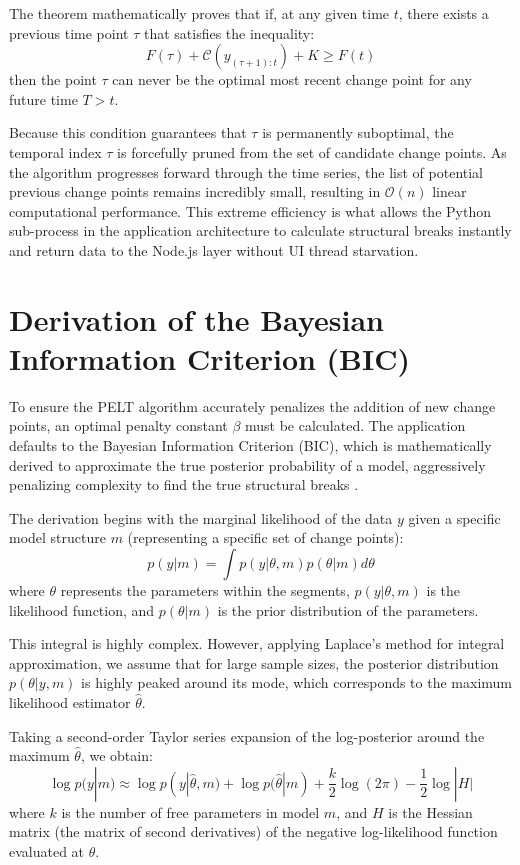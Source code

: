 \documentclass[11pt, a4paper]{report}
\begin{document}
The theorem mathematically proves that if, at any given time $t$, there exists a previous time point $\tau$ that satisfies the inequality:
\begin{equation}
    F(\tau) + \mathcal{C}(y_{(\tau+1):t}) + K \ge F(t)
\end{equation}
then the point $\tau$ can never be the optimal most recent change point for any future time $T > t$. 

Because this condition guarantees that $\tau$ is permanently suboptimal, the temporal index $\tau$ is forcefully pruned from the set of candidate change points. As the algorithm progresses forward through the time series, the list of potential previous change points remains incredibly small, resulting in $\mathcal{O}(n)$ linear computational performance. This extreme efficiency is what allows the Python sub-process in the application architecture to calculate structural breaks instantly and return data to the Node.js layer without UI thread starvation.

\section{Derivation of the Bayesian Information Criterion (BIC)}
To ensure the PELT algorithm accurately penalizes the addition of new change points, an optimal penalty constant $\beta$ must be calculated. The application defaults to the Bayesian Information Criterion (BIC), which is mathematically derived to approximate the true posterior probability of a model, aggressively penalizing complexity to find the true structural breaks \cite{Schwarz1978}.

The derivation begins with the marginal likelihood of the data $y$ given a specific model structure $m$ (representing a specific set of change points):
\begin{equation}
    p(y | m) = \int p(y | \theta, m) p(\theta | m) d\theta
\end{equation}
where $\theta$ represents the parameters within the segments, $p(y | \theta, m)$ is the likelihood function, and $p(\theta | m)$ is the prior distribution of the parameters. 

This integral is highly complex. However, applying Laplace's method for integral approximation, we assume that for large sample sizes, the posterior distribution $p(\theta | y, m)$ is highly peaked around its mode, which corresponds to the maximum likelihood estimator $\hat{\theta}$. 

Taking a second-order Taylor series expansion of the log-posterior around the maximum $\hat{\theta}$, we obtain:
\begin{equation}
    \log p(y | m) \approx \log p(y | \hat{\theta}, m) + \log p(\hat{\theta} | m) + \frac{k}{2} \log(2\pi) - \frac{1}{2} \log |H|
\end{equation}
where $k$ is the number of free parameters in model $m$, and $H$ is the Hessian matrix (the matrix of second derivatives) of the negative log-likelihood function evaluated at $\hat{\theta}$. 
\end{document}
